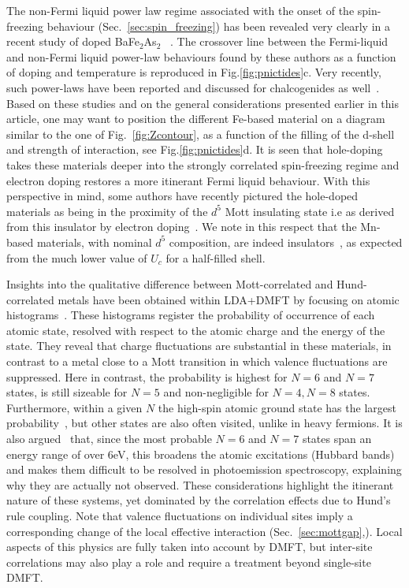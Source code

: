 \documentclass[]{ar2e-changed}%
\def\BFA{BaFe$_2$As$_2$}
\begin{document}
The non-Fermi liquid power law regime associated with the onset of the
spin-freezing behaviour (Sec.~\ref{sec:spin_freezing}) has been
revealed very clearly in a recent study of doped \BFA
~\cite{Werner_122_dynU}. The crossover line between the Fermi-liquid
and non-Fermi liquid power-law behaviours found by these authors as a
function of doping and temperature is reproduced in
Fig.\ref{fig:pnictides}c. 
%
Very recently, such power-laws have been reported and discussed for chalcogenides 
as well~\cite{yin_powerlaws_arxiv_2012}. 
% 
Based on these studies and on the general considerations presented
earlier in this article, one may want to position the different
Fe-based material on a diagram similar to the one of
Fig.~\ref{fig:Zcontour}, as a function of the filling of the d-shell
and strength of interaction, see Fig.\ref{fig:pnictides}d.
% 
It is seen that hole-doping takes these materials deeper into the
strongly correlated spin-freezing regime and electron doping restores
a more itinerant Fermi liquid behaviour.
% 
With this perspective in mind, some authors have recently pictured the
hole-doped materials as being in the proximity of the $d^5$ Mott
insulating state i.e as derived from this insulator by electron
doping~\cite{Liebsch_FeSe_spinfreezing,Liebsch_pseudogap,Misawa_d5-proximity_magnetic}. 
%
We note in this respect that the Mn-based materials, with nominal
$d^5$ composition, are indeed insulators~\cite{pandey_BaKMnAs2_prl_2012}, 
as expected from the much lower value of $U_c$ for a half-filled shell.

Insights into the qualitative difference between Mott-correlated and Hund-correlated metals have been 
obtained within LDA+DMFT by focusing on atomic histograms~\cite{Kutepov_pnictides_parameters-GW,Yin_kinetic_frustration_allFeSC}. 
%
These histograms register the probability of occurrence of each atomic state, resolved with respect to the atomic charge 
and the energy of the state. 
%
They reveal that charge fluctuations are substantial in these materials, in contrast to a metal close to a Mott transition in which 
valence fluctuations are suppressed. Here in contrast, the probability is highest for  $N=6$ and $N=7$ states, 
is still sizeable for $N=5$ and non-negligible for $N=4,N=8$ states. 
% 
Furthermore, within a given $N$ the high-spin atomic ground state has the largest
probability~\cite{Kutepov_pnictides_parameters-GW}, but other states are also often visited, unlike in heavy fermions. 
It is also argued~\cite{Yin_kinetic_frustration_allFeSC,Kutepov_pnictides_parameters-GW} that, 
since the most probable $N=6$ and $N=7$ states span an energy range of over 6eV, this
broadens the atomic excitations (Hubbard bands) and makes them
difficult to be resolved in photoemission spectroscopy, explaining why they are actually not observed. 
These considerations highlight the itinerant nature of these systems, yet dominated by the correlation 
effects due to Hund's rule coupling.
%
Note that valence fluctuations on individual sites imply a corresponding change of the local 
effective interaction (Sec.~\ref{sec:mottgap},\cite{vandermarel_sawatzky_prb_1988}). 
Local aspects of this physics are fully taken into account by DMFT, 
but inter-site correlations may also play a role and require a treatment beyond single-site DMFT.  
\end{document}
